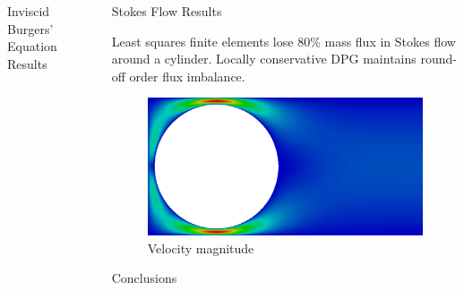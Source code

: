 \documentclass[final]{beamer}
\newlength{\sepwid}
\newlength{\onecolwid}
\begin{document}
\begin{frame}[t]
\begin{columns}[t]
\begin{column}{\onecolwid}
\begin{block}{Inviscid Burgers' Equation Results}
\end{block}


\end{column} %

\begin{column}{\sepwid}\end{column} %

\begin{column}{\onecolwid} %

\begin{block}{Stokes Flow Results}

Least squares finite elements lose 80\% mass flux in Stokes flow
around a cylinder. Locally conservative DPG maintains round-off order flux
imbalance.
\vspace{1ex}
\begin{figure}
\includegraphics[width=0.95\linewidth]{figs/Stokes/graph6c_umag.png}
\caption*{Velocity magnitude}
\end{figure}

\end{block}

\vspace{-4ex}

\begin{block}{Conclusions}


\end{block}
\end{column}
\end{columns}
\end{frame}
\end{document}
